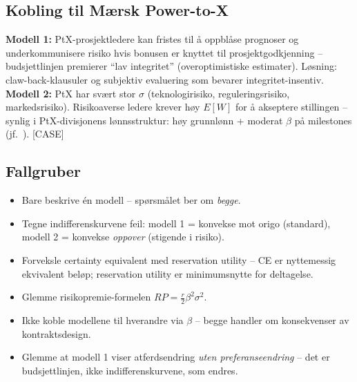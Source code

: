 \subsection*{Kobling til Mærsk Power-to-X}
\textbf{Modell 1:} PtX-prosjektledere kan fristes til å oppblåse prognoser og underkommunisere risiko hvis bonusen er knyttet til prosjektgodkjenning -- budsjettlinjen premierer ``lav integritet'' (overoptimistiske estimater). Løsning: claw-back-klausuler og subjektiv evaluering som bevarer integritet-insentiv. \textbf{Modell 2:} PtX har svært stor $\sigma$ (teknologirisiko, reguleringsrisiko, markedsrisiko). Risikoaverse ledere krever høy $E[W]$ for å akseptere stillingen -- synlig i PtX-divisjonens lønnsstruktur: høy grunnlønn + moderat $\beta$ på milestones (jf.\ ). [CASE]

\subsection*{Fallgruber}
\begin{itemize}\setlength{\itemsep}{2pt}
\item Bare beskrive én modell -- spørsmålet ber om \emph{begge}.
\item Tegne indifferenskurvene feil: modell 1 = konvekse mot origo (standard), modell 2 = konvekse \emph{oppover} (stigende i risiko).
\item Forveksle certainty equivalent med reservation utility -- CE er nyttemessig ekvivalent beløp; reservation utility er minimumsnytte for deltagelse.
\item Glemme risikopremie-formelen $RP = \tfrac{r}{2}\beta^2\sigma^2$.
\item Ikke koble modellene til hverandre via $\beta$ -- begge handler om konsekvenser av kontraktsdesign.
\item Glemme at modell 1 viser atferdsendring \emph{uten preferanseendring} -- det er budsjettlinjen, ikke indifferenskurvene, som endres.
\end{itemize}

\FloatBarrier
